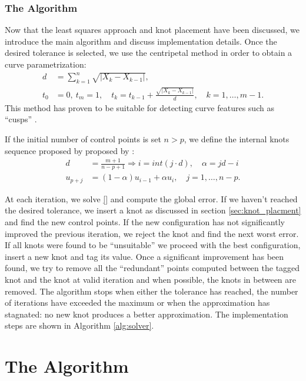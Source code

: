 \subsubsection{The Algorithm}
Now that the least squares approach and knot placement have been discussed, we introduce the main algorithm and discuss implementation 
details. Once the desired tolerance is selected, we use the centripetal method in order to obtain a curve parametrization: 
\begin{align}
 d &= \sum_{k=1}^n \sqrt {| X_k-X_{k-1}|},\\
 t_0 &=0,\ t_m=1,\quad t_k = t_{k-1} + \frac{\sqrt{|X_k-X_{k-1}|}}{d},\quad k = 1,\ldots, m-1.
 \end{align}
This method has proven to be suitable for detecting curve features such as ``cusps'' \cite{}. 
\begin{note}
 If the initial number of control points is set $n > p$, we define the internal knots sequence proposed by proposed by \cite{}: 
  \begin{align}
  d &= \frac{m+1}{n-p+1} \Rightarrow i = int(j\cdot d),\quad \alpha = jd -i\\
  u_{p+j} &= (1-\alpha)u_{i-1} + \alpha u_i,\quad j = 1,\ldots,n-p.
 \end{align}
\end{note}

At each iteration, we solve \eqref{} and compute the global error. If we haven't reached the desired tolerance, 
we insert a knot as discussed in section \ref{sec:knot_placment} and find the new control points. If the 
new configuration has not significantly improved the previous iteration, we reject the knot and find the next worst error. 
 If all knots were found to be ``unsuitable'' we proceed with the best configuration, insert a new knot and tag its 
 value. Once a significant improvement has been found, we try to remove all the ``redundant'' points computed between the tagged knot and the 
 knot at valid iteration and when possible, the knots in between are removed. The algorithm stops when either the tolerance has reached, 
 the number of iterations have exceeded the maximum or when the approximation has stagnated: no new knot 
 produces a better approximation. The implementation steps are shown in Algorithm \ref{alg:solver}. 

 
 
 \section{The Algorithm}
 
